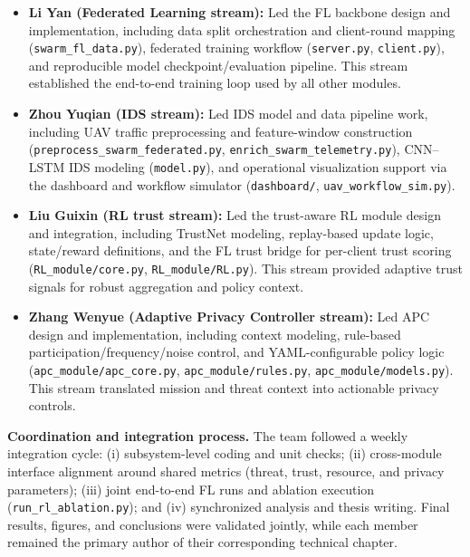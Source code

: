 \documentclass[11pt,a4paper,oneside]{report}
\begin{document}
\begin{itemize}
  \item \textbf{Li Yan (Federated Learning stream):} Led the FL backbone design and implementation, including data split orchestration and client-round mapping (\texttt{swarm\_fl\_data.py}), federated training workflow (\texttt{server.py}, \texttt{client.py}), and reproducible model checkpoint/evaluation pipeline. This stream established the end-to-end training loop used by all other modules.

  \item \textbf{Zhou Yuqian (IDS stream):} Led IDS model and data pipeline work, including UAV traffic preprocessing and feature-window construction (\texttt{preprocess\_swarm\_federated.py}, \texttt{enrich\_swarm\_telemetry.py}), CNN--LSTM IDS modeling (\texttt{model.py}), and operational visualization support via the dashboard and workflow simulator (\texttt{dashboard/}, \texttt{uav\_workflow\_sim.py}).

  \item \textbf{Liu Guixin (RL trust stream):} Led the trust-aware RL module design and integration, including TrustNet modeling, replay-based update logic, state/reward definitions, and the FL trust bridge for per-client trust scoring (\texttt{RL\_module/core.py}, \texttt{RL\_module/RL.py}). This stream provided adaptive trust signals for robust aggregation and policy context.

  \item \textbf{Zhang Wenyue (Adaptive Privacy Controller stream):} Led APC design and implementation, including context modeling, rule-based participation/frequency/noise control, and YAML-configurable policy logic (\texttt{apc\_module/apc\_core.py}, \texttt{apc\_module/rules.py}, \texttt{apc\_module/models.py}). This stream translated mission and threat context into actionable privacy controls.
\end{itemize}

\noindent\textbf{Coordination and integration process.}  
The team followed a weekly integration cycle: (i) subsystem-level coding and unit checks; (ii) cross-module interface alignment around shared metrics (threat, trust, resource, and privacy parameters); (iii) joint end-to-end FL runs and ablation execution (\texttt{run\_rl\_ablation.py}); and (iv) synchronized analysis and thesis writing. Final results, figures, and conclusions were validated jointly, while each member remained the primary author of their corresponding technical chapter.
\end{document}
